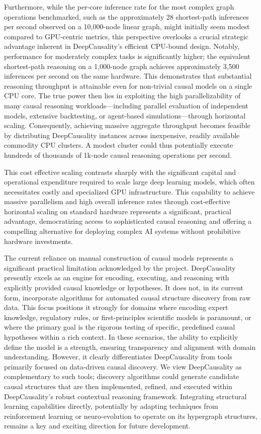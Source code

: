 Furthermore, while the per-core inference rate for the most complex graph operations benchmarked, such as the approximately 28 shortest-path inferences per second observed on a 10,000-node linear graph, might initially seem modest compared to GPU-centric metrics, this perspective overlooks a crucial strategic advantage inherent in DeepCausality's efficient CPU-bound design. Notably, performance for moderately complex tasks is significantly higher; the equivalent shortest-path reasoning on a 1,000-node graph achieves approximately 3,500 inferences per second on the same hardware. This demonstrates that substantial reasoning throughput is attainable even for non-trivial causal models on a single CPU core. The true power then lies in exploiting the high parallelizability of many causal reasoning workloads—including parallel evaluation of independent models, extensive backtesting, or agent-based simulations—through horizontal scaling. Consequently, achieving massive aggregate throughput becomes feasible by distributing DeepCausality instances across inexpensive, readily available commodity CPU clusters. A modest cluster could thus potentially execute hundreds of thousands of 1k-node causal reasoning operations per second.

\newpage

This cost effective scaling contrasts sharply with the significant capital and operational expenditure required to scale large deep learning models, which often necessitates costly and specialized GPU infrastructure. This capability to achieve massive parallelism and high overall inference rates through cost-effective horizontal scaling on standard hardware represents a significant, practical advantage, democratizing access to sophisticated causal reasoning and offering a compelling alternative for deploying complex AI systems without prohibitive hardware investments.

The current reliance on manual construction of causal models represents a significant practical limitation acknowledged by the project. DeepCausality presently excels as an engine for encoding, executing, and reasoning with explicitly provided causal knowledge or hypotheses. It does not, in its current form, incorporate algorithms for automated causal structure discovery from raw data. This focus positions it strongly for domains where encoding expert knowledge, regulatory rules, or first-principles scientific models is paramount, or where the primary goal is the rigorous testing of specific, predefined causal hypotheses within a rich context. In these scenarios, the ability to explicitly define the model is a strength, ensuring transparency and alignment with domain understanding. However, it clearly differentiates DeepCausality from tools primarily focused on data-driven causal discovery. We view DeepCausality as complementary to such tools; discovery algorithms could generate candidate causal structures that are then implemented, refined, and executed within DeepCausality's robust contextual reasoning framework. Integrating structural learning capabilities directly, potentially by adapting techniques from reinforcement learning or neuro-evolution to operate on its hypergraph structures, remains a key and exciting direction for future development.

